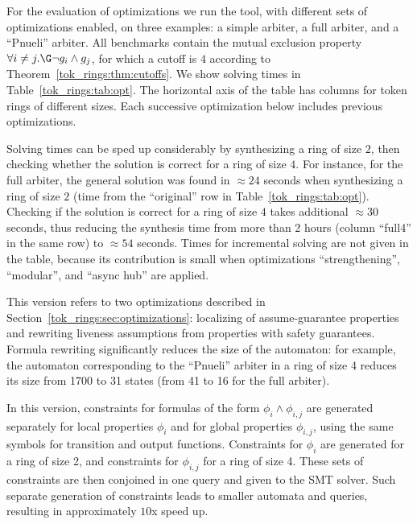 For the evaluation of optimizations we run the tool,
with different sets of optimizations enabled,
on three examples:
a simple arbiter, a full arbiter, and a ``Pnueli'' arbiter.
All benchmarks contain the mutual exclusion property $\forall i \neq j. \G\neg g_i \land g_j$,
for which a cutoff is $4$ according to Theorem~\ref{tok_rings:thm:cutoffs}.
We show solving times in Table~\ref{tok_rings:tab:opt}.
The horizontal axis of the table has columns for token rings of different sizes.
Each successive optimization below includes previous optimizations.

Solving times can be sped up considerably by synthesizing a ring of size $2$,
then checking whether the solution is correct for a ring of size $4$.
For instance, for the full arbiter, the general solution was found in $\approx\!24$ seconds
when synthesizing a ring of size $2$ (time from the ``original'' row in Table~\ref{tok_rings:tab:opt}).
Checking if the solution is correct for a ring of size $4$ takes additional $\approx\!30$ seconds,
thus reducing the synthesis time from more than 2 hours (column ``full4'' in the same row)
to $\approx\!54$ seconds.
Times for incremental solving are not given in the table,
because its contribution is small when optimizations ``strengthening'', ``modular'', and ``async hub'' are applied.

This version refers to two optimizations described in Section~\ref{tok_rings:sec:optimizations}:
localizing of assume-guarantee properties and
rewriting liveness assumptions from properties with safety guarantees.
Formula rewriting significantly reduces the size of the automaton:
for example, the automaton corresponding to the ``Pnueli'' arbiter in a ring of size 4
reduces its size from 1700 to 31 states
(from 41 to 16 for the full arbiter).

In this version,
constraints for formulas of the form $\phi_i \land \phi_{i,j}$ are
generated separately for local properties $\phi_i$ and for global properties $\phi_{i,j}$,
using the same symbols for transition and output functions.
Constraints for $\phi_i$ are generated for a ring of size 2,
and constraints for $\phi_{i,j}$ for a ring of size 4.
These sets of constraints are then conjoined in one query and given to the SMT solver.
Such separate generation of constraints leads to smaller automata and queries,
resulting in approximately $10$x speed up.

